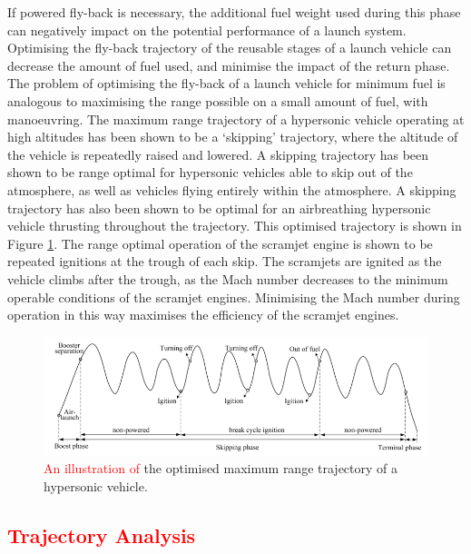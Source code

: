 If powered fly-back is necessary, the additional fuel weight used during this phase can negatively impact on the potential performance of a launch system. 
Optimising the fly-back trajectory of the reusable stages of a launch vehicle can decrease the amount of fuel used, and minimise the impact of the return phase. 
 The problem of optimising the fly-back of a launch vehicle for minimum fuel is analogous to maximising the range possible on a small amount of fuel, with manoeuvring. The maximum range trajectory of a hypersonic vehicle operating at high altitudes has been shown to be a `skipping' trajectory, where the altitude of the vehicle is repeatedly raised and lowered\cite{Moshman2014,Darby2011,Toso2015,Chai2015}. A skipping trajectory has been shown to be range optimal for hypersonic vehicles able to skip out of the atmosphere\cite{Eggers1957,Moshman2014}, as well as vehicles flying entirely within the atmosphere\cite{Moshman2014,Darby2011,Toso2015,Tetlow1992}. A skipping trajectory has also been shown to be optimal for an airbreathing hypersonic vehicle thrusting throughout the trajectory\cite{Kanda2007,Chai2015}. This optimised trajectory is shown in Figure \ref{fig:chai-boostskip}. The range optimal operation of the scramjet engine is shown to be repeated ignitions at the trough of each skip\cite{Chai2015}. The scramjets are ignited as the vehicle climbs after the trough, as the Mach number decreases to the minimum operable conditions of the scramjet engines\cite{Chai2015}. Minimising the Mach number during operation in this way maximises the efficiency of the scramjet engines\cite{Chai2015}.
 
 \begin{figure}[ht]
 	\centering
 	\includegraphics[width=0.9\linewidth]{"figures/2_literature-review/chai-boost skip"}
 	\caption{\textcolor{red}{An illustration of }the optimised maximum range trajectory of a hypersonic vehicle\cite{Chai2015}.}
 	\label{fig:chai-boostskip}
 \end{figure}

\textcolor{red}{
	\section{Trajectory Analysis}
}

